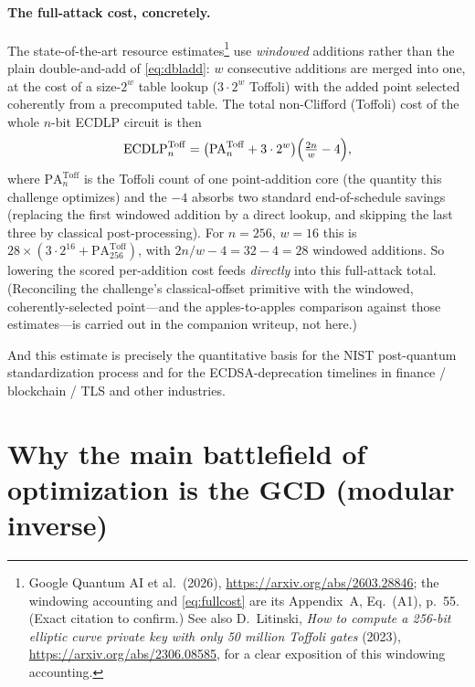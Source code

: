 \documentclass[11pt]{article}
\begin{document}
\paragraph{The full-attack cost, concretely.}
The state-of-the-art resource estimates\footnote{Google Quantum AI et al.\ (2026), \url{https://arxiv.org/abs/2603.28846}; the windowing accounting and \eqref{eq:fullcost} are its Appendix~A, Eq.~(A1), p.~55. (Exact citation to confirm.) See also D.~Litinski, \emph{How to compute a 256-bit elliptic curve private key with only 50 million Toffoli gates} (2023), \url{https://arxiv.org/abs/2306.08585}, for a clear exposition of this windowing accounting.} use \emph{windowed} additions rather than the plain double-and-add of \eqref{eq:dbladd}: $w$ consecutive additions are merged into one, at the cost of a size-$2^{w}$ table lookup ($3\cdot2^{w}$ Toffoli) with the added point selected coherently from a precomputed table. The total non-Clifford (Toffoli) cost of the whole $n$-bit ECDLP circuit is then
\begin{equation}
\mathrm{ECDLP}^{\mathrm{Toff}}_n=\bigl(\mathrm{PA}^{\mathrm{Toff}}_n+3\cdot2^{w}\bigr)\Bigl(\tfrac{2n}{w}-4\Bigr),
\label{eq:fullcost}
\end{equation}
where $\mathrm{PA}^{\mathrm{Toff}}_n$ is the Toffoli count of one point-addition core (the quantity this challenge optimizes) and the $-4$ absorbs two standard end-of-schedule savings (replacing the first windowed addition by a direct lookup, and skipping the last three by classical post-processing). For $n=256$, $w=16$ this is $28\times(3\cdot2^{16}+\mathrm{PA}^{\mathrm{Toff}}_{256})$, with $2n/w-4=32-4=28$ windowed additions. So lowering the scored per-addition cost feeds \emph{directly} into this full-attack total. (Reconciling the challenge's classical-offset primitive with the windowed, coherently-selected point---and the apples-to-apples comparison against those estimates---is carried out in the companion writeup, not here.)

And this estimate is precisely the quantitative basis for the NIST post-quantum
standardization process and for the ECDSA-deprecation timelines in finance / blockchain / TLS and other industries.

\section{Why the main battlefield of optimization is the GCD (modular inverse)}
\label{sec:gcd}
\end{document}
